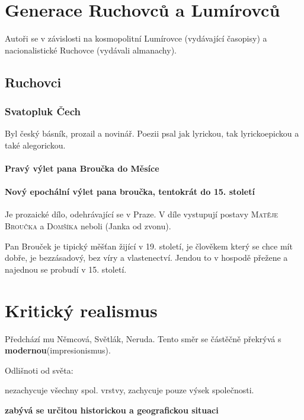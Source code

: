\documentclass[10pt,a4page,headings,openany,%
oneside
,twocolumn
]{report}
\begin{document}
\section{Generace Ruchovců a Lumírovců}
Autoři se v závislosti na kosmopolitní Lumírovce (vydávající časopisy) a nacionalistické Ruchovce (vydávali almanachy).

\subsection{Ruchovci}

\subsubsection{Svatopluk Čech}
Byl český básník, prozail a novinář. Poezii psal jak lyrickou, tak lyrickoepickou a také alegorickou.

\paragraph{Pravý výlet pana Broučka do Měsíce}
\paragraph{Nový epochální výlet pana broučka, tentokrát do 15. století}
Je prozaické dílo, odehrávající se v Praze. V díle vystupují postavy \textsc{Matěje Broučka} a \textsc{Domšíka} neboli (Janka od zvonu). 

Pan Brouček je tipický měšťan žijící v 19. století, je člověkem který se chce mít dobře, je bezzásadový, bez víry a vlastenectví. Jendou to v hospodě přežene a najednou se probudí v 15. století. 

\section{Kritický realismus}
Předchází mu Němcová, Světlák, Neruda. Tento směr se částěčně překrývá s \textbf{modernou}(impresionismus).


Odlišnoti od světa:
\begin{description}


\item[není komplexní] nezachycuje všechny spol. vrstvy, zachycuje pouze výsek společnosti.
\item[Využití kronik, záznamů a novin]
\item\textbf{zabývá se určitou historickou a geografickou situaci}
\item[Využívá archaismů a dialektu]
\end{description}
\end{document}
